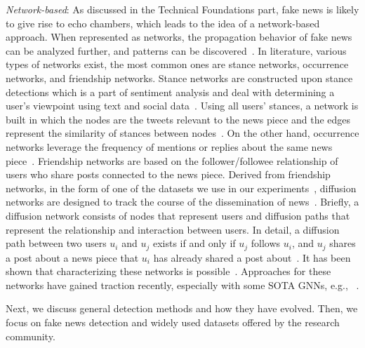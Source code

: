 \begin{description}
    \item{\emph{Network-based}:} As discussed in the Technical Foundations part, fake news is likely to give rise to echo chambers, which leads to the idea of a network-based approach. When represented as networks, the propagation behavior of fake news can be analyzed further, and patterns can be discovered~\parencite{FakeNewsDetectionOnSocialMediaADataMiningPerspective_Shu}. In literature, various types of networks exist, the most common ones are stance networks, occurrence networks, and friendship networks. Stance networks are constructed upon stance detections which is a part of sentiment analysis and deal with determining a user’s viewpoint using text and social data~\parencite{StanceClassificationAttention_Du}. Using all users’ stances, a network is built in which the nodes are the tweets relevant to the news piece and the edges represent the similarity of stances between nodes~\parencite{NewsVerificationByExploitingConflictingSocialViewpoints_Jin, SomeLikeItHoaxDataset_Tacchini}. On the other hand, occurrence networks leverage the frequency of mentions or replies about the same news piece~\parencite{ProminentFeaturesOfRumorPropagation_Kwon}. Friendship networks are based on the follower/followee relationship of users who share posts connected to the news piece. Derived from friendship networks, in the form of one of the datasets we use in our experiments~\parencite{UPFD_Dataset_Shu}, diffusion networks are designed to track the course of the dissemination of news~\parencite{ProminentFeaturesOfRumorPropagation_Kwon}. Briefly, a diffusion network consists of nodes that represent users and diffusion paths that represent the relationship and interaction between users. In detail, a diffusion path between two users $u_i$ and $u_j$ exists if and only if $u_j$ follows $u_i$, and $u_j$ shares a post about a news piece that $u_i$ has already shared a post about~\parencite{FakeNewsDetectionOnSocialMediaADataMiningPerspective_Shu}. It has been shown that characterizing these networks is possible~\parencite{ProminentFeaturesOfRumorPropagation_Kwon}. Approaches for these networks have gained traction recently, especially with some SOTA GNNs, e.g., ~\parencite{FakeNewsDetectionUsingGeometricDeepLearning_Monti}.

\end{description}

Next, we discuss general detection methods and how they have evolved. Then, we focus on fake news detection and widely used datasets offered
by the research community.


